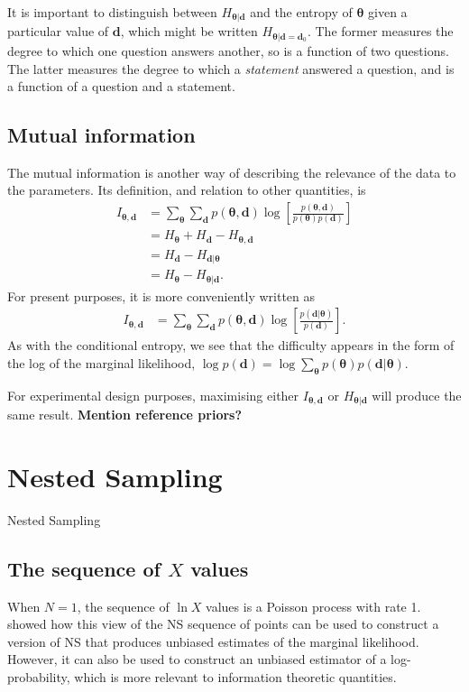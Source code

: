 \documentclass[entropy,article,submit,oneauthor,pdftex,10pt,a4paper]{mdpi}
\renewcommand{\d}{\boldsymbol{d}}
\newcommand{\todo}{\color{orange} \bf}
\newcommand{\x}{\boldsymbol{\theta}}
\begin{document}
It is important to distinguish between $H_{\x | \d}$ and the
entropy of $\x$ given a particular value of $\d$, which might be written
$H_{\x | \d=\d_0}$.
The former measures the degree to which one question answers
another, so is a function of two questions. The latter measures the
degree to which a {\em statement} answered a question, and is a function
of a question and a statement.



\subsection{Mutual information}
The mutual information is another way of describing the relevance of the
data to the parameters. Its definition, and relation to other quantities, is
\begin{align}
I_{\x, \d} &= \sum_{\x} \sum_{\d} p(\x, \d)
                       \log\left[\frac{p(\x, \d)}{p(\x)p(\d)}\right]\\
           &= H_{\x} + H_{\d} - H_{\x, \d}\\
           &= H_{\d} - H_{\d | \x}\\
           &= H_{\x} - H_{\x | \d}.
\end{align}
For present purposes, it is more conveniently written as
\begin{align}
I_{\x, \d} &= \sum_{\x} \sum_{\d} p(\x, \d)
              \log\left[\frac{p(\d | \x)}{p(\d)}\right].
\end{align}
As with the conditional entropy, we see that the difficulty appears in the
form of the log of the marginal likelihood,
$\log p(\d) = \log \sum_{\x} p(\x)p(\d | \x)$.


For experimental design purposes, maximising either $I_{\x, \d}$ or
$H_{\x | \d}$ will produce the same result. {\todo Mention reference priors?}


\section{Nested Sampling}

Nested Sampling \citep[NS][]{skilling2006nested}


\subsection{The sequence of $X$ values}

When $N=1$, the sequence of $\ln X$ values is a Poisson process with rate
1. \citet{Walter2015} showed how this view of the NS sequence of points
can be used to construct a
version of NS that produces unbiased estimates of the marginal likelihood.
However, it can also be used to construct an unbiased estimator of
a log-probability, which is more relevant to information theoretic
quantities.
\end{document}

